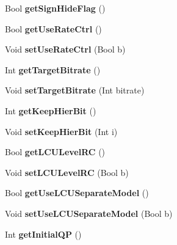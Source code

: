 \begin{DoxyCompactItemize}
Bool {\bfseries get\+Sign\+Hide\+Flag} ()
\item 
\mbox{\label{class_t_enc_cfg_aa5e81a7c2c1bca59b9102321a14a4c81}} 
Bool {\bfseries get\+Use\+Rate\+Ctrl} ()
\item 
\mbox{\label{class_t_enc_cfg_ab8c4457163f5bcd89bc496f8ed76ba8a}} 
Void {\bfseries set\+Use\+Rate\+Ctrl} (Bool b)
\item 
\mbox{\label{class_t_enc_cfg_a323aede3693006c0ce132e40ae7edff7}} 
Int {\bfseries get\+Target\+Bitrate} ()
\item 
\mbox{\label{class_t_enc_cfg_adb26b34597598c35cb9db4db90ca27ec}} 
Void {\bfseries set\+Target\+Bitrate} (Int bitrate)
\item 
\mbox{\label{class_t_enc_cfg_a917a5a13947602a06206dee99ed1fdbc}} 
Int {\bfseries get\+Keep\+Hier\+Bit} ()
\item 
\mbox{\label{class_t_enc_cfg_a1e7d95152d97d5fbc2433fad6b44de5d}} 
Void {\bfseries set\+Keep\+Hier\+Bit} (Int i)
\item 
\mbox{\label{class_t_enc_cfg_a0b52a4a35fc2bb0c0154e22c922cedfa}} 
Bool {\bfseries get\+L\+C\+U\+Level\+RC} ()
\item 
\mbox{\label{class_t_enc_cfg_a3cac4828e85eec561fb6e786a4d05875}} 
Void {\bfseries set\+L\+C\+U\+Level\+RC} (Bool b)
\item 
\mbox{\label{class_t_enc_cfg_a49f173ec5d88f21f7065ea5c76c5b22c}} 
Bool {\bfseries get\+Use\+L\+C\+U\+Separate\+Model} ()
\item 
\mbox{\label{class_t_enc_cfg_acfa80b35d04cd21390da6c400ddbab04}} 
Void {\bfseries set\+Use\+L\+C\+U\+Separate\+Model} (Bool b)
\item 
\mbox{\label{class_t_enc_cfg_ac1bdff703ff488b63f6f6b2d3e4242fd}} 
Int {\bfseries get\+Initial\+QP} ()
\item 
\mbox{\label{class_t_enc_cfg_a4004217c3f044ba7d09b05c44e563cdc}} 

\end{DoxyCompactItemize}
